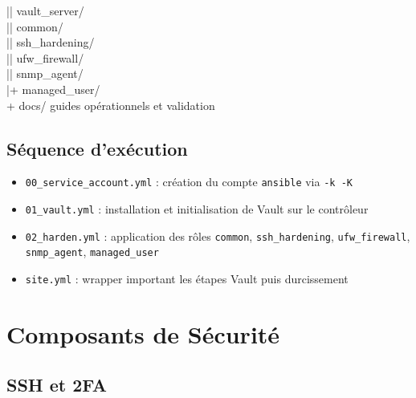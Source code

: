 \documentclass[11pt,a4paper]{article}
\begin{document}
\begin{tcolorbox}
\textcolor{PrimaryBlue}{|}\hspace{1em}\textcolor{PrimaryBlue}{|} vault\_server/ \\
\textcolor{PrimaryBlue}{|}\hspace{1em}\textcolor{PrimaryBlue}{|} common/ \\
\textcolor{PrimaryBlue}{|}\hspace{1em}\textcolor{PrimaryBlue}{|} ssh\_hardening/ \\
\textcolor{PrimaryBlue}{|}\hspace{1em}\textcolor{PrimaryBlue}{|} ufw\_firewall/ \\
\textcolor{PrimaryBlue}{|}\hspace{1em}\textcolor{PrimaryBlue}{|} snmp\_agent/ \\
\textcolor{PrimaryBlue}{|}\hspace{1em}\textcolor{PrimaryBlue}{+} managed\_user/ \\
\textcolor{PrimaryBlue}{+} docs/ \hfill \normalfont\small\textcolor{MediumGray}{guides opérationnels et validation}
\end{tcolorbox}

\subsection{Séquence d'exécution}

\begin{itemize}
  \item \texttt{00\_service\_account.yml} : création du compte \texttt{ansible} via \texttt{-k -K}
  \item \texttt{01\_vault.yml} : installation et initialisation de Vault sur le contrôleur
  \item \texttt{02\_harden.yml} : application des rôles \texttt{common}, \texttt{ssh\_hardening}, \texttt{ufw\_firewall}, \texttt{snmp\_agent}, \texttt{managed\_user}
  \item \texttt{site.yml} : wrapper important les étapes Vault puis durcissement
\end{itemize}

\section{Composants de Sécurité}

\subsection{SSH et 2FA}
\end{document}
